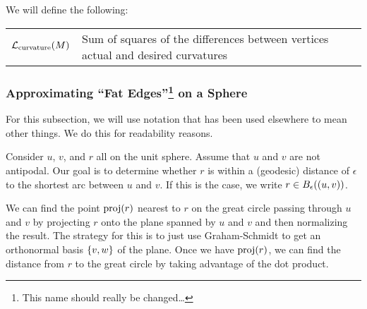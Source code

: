 We will define the following: \begin{center}\begin{tabular}{r|l}
	\(\mathcal{L}_{\mathrm{curvature}}\pof{M}\) & Sum of squares of the differences between vertices actual and desired curvatures
\end{tabular}\end{center}

\subsubsection[Approximating "Fat Edges" on a Sphere]{Approximating ``Fat Edges''\footnote{This name should really be changed\dots}  on a Sphere}
For this subsection, we will use notation that has been used elsewhere to mean other things. We do this for readability reasons.

Consider \(u\), \(v\), and \(r\) all on the unit sphere. Assume that \(u\) and \(v\) are not antipodal. Our goal is to determine whether \(r\) is within a (geodesic) distance of \(\epsilon\) to the shortest arc between \(u\) and \(v\). If this is the case, we write \(r \in B_\epsilon\pof{\pof{u, v}}\).

We can find the point \(\proj\pof{r}\) nearest to \(r\) on the great circle passing through \(u\) and \(v\) by projecting \(r\) onto the plane spanned by \(u\) and \(v\) and then normalizing the result. The strategy for this is to just use Graham-Schmidt to get an orthonormal basis \(\cof{v, w}\) of the plane. Once we have \(\proj\pof{r}\), we can find the distance from \(r\) to the great circle by taking advantage of the dot product.

